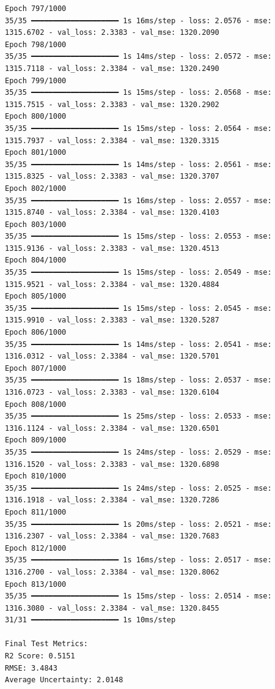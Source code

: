 \documentclass[
  letterpaper,
  DIV=11,
  numbers=noendperiod]{scrreprt}
\begin{document}
\begin{verbatim}
Epoch 797/1000
35/35 ━━━━━━━━━━━━━━━━━━━━ 1s 16ms/step - loss: 2.0576 - mse: 1315.6702 - val_loss: 2.3383 - val_mse: 1320.2090
Epoch 798/1000
35/35 ━━━━━━━━━━━━━━━━━━━━ 1s 14ms/step - loss: 2.0572 - mse: 1315.7118 - val_loss: 2.3384 - val_mse: 1320.2490
Epoch 799/1000
35/35 ━━━━━━━━━━━━━━━━━━━━ 1s 15ms/step - loss: 2.0568 - mse: 1315.7515 - val_loss: 2.3383 - val_mse: 1320.2902
Epoch 800/1000
35/35 ━━━━━━━━━━━━━━━━━━━━ 1s 15ms/step - loss: 2.0564 - mse: 1315.7937 - val_loss: 2.3384 - val_mse: 1320.3315
Epoch 801/1000
35/35 ━━━━━━━━━━━━━━━━━━━━ 1s 14ms/step - loss: 2.0561 - mse: 1315.8325 - val_loss: 2.3383 - val_mse: 1320.3707
Epoch 802/1000
35/35 ━━━━━━━━━━━━━━━━━━━━ 1s 16ms/step - loss: 2.0557 - mse: 1315.8740 - val_loss: 2.3384 - val_mse: 1320.4103
Epoch 803/1000
35/35 ━━━━━━━━━━━━━━━━━━━━ 1s 15ms/step - loss: 2.0553 - mse: 1315.9136 - val_loss: 2.3383 - val_mse: 1320.4513
Epoch 804/1000
35/35 ━━━━━━━━━━━━━━━━━━━━ 1s 15ms/step - loss: 2.0549 - mse: 1315.9521 - val_loss: 2.3384 - val_mse: 1320.4884
Epoch 805/1000
35/35 ━━━━━━━━━━━━━━━━━━━━ 1s 15ms/step - loss: 2.0545 - mse: 1315.9910 - val_loss: 2.3383 - val_mse: 1320.5287
Epoch 806/1000
35/35 ━━━━━━━━━━━━━━━━━━━━ 1s 14ms/step - loss: 2.0541 - mse: 1316.0312 - val_loss: 2.3384 - val_mse: 1320.5701
Epoch 807/1000
35/35 ━━━━━━━━━━━━━━━━━━━━ 1s 18ms/step - loss: 2.0537 - mse: 1316.0723 - val_loss: 2.3383 - val_mse: 1320.6104
Epoch 808/1000
35/35 ━━━━━━━━━━━━━━━━━━━━ 1s 25ms/step - loss: 2.0533 - mse: 1316.1124 - val_loss: 2.3384 - val_mse: 1320.6501
Epoch 809/1000
35/35 ━━━━━━━━━━━━━━━━━━━━ 1s 24ms/step - loss: 2.0529 - mse: 1316.1520 - val_loss: 2.3383 - val_mse: 1320.6898
Epoch 810/1000
35/35 ━━━━━━━━━━━━━━━━━━━━ 1s 24ms/step - loss: 2.0525 - mse: 1316.1918 - val_loss: 2.3384 - val_mse: 1320.7286
Epoch 811/1000
35/35 ━━━━━━━━━━━━━━━━━━━━ 1s 20ms/step - loss: 2.0521 - mse: 1316.2307 - val_loss: 2.3384 - val_mse: 1320.7683
Epoch 812/1000
35/35 ━━━━━━━━━━━━━━━━━━━━ 1s 16ms/step - loss: 2.0517 - mse: 1316.2700 - val_loss: 2.3384 - val_mse: 1320.8062
Epoch 813/1000
35/35 ━━━━━━━━━━━━━━━━━━━━ 1s 15ms/step - loss: 2.0514 - mse: 1316.3080 - val_loss: 2.3384 - val_mse: 1320.8455
31/31 ━━━━━━━━━━━━━━━━━━━━ 1s 10ms/step

Final Test Metrics:
R2 Score: 0.5151
RMSE: 3.4843
Average Uncertainty: 2.0148
\end{verbatim}
\end{document}
